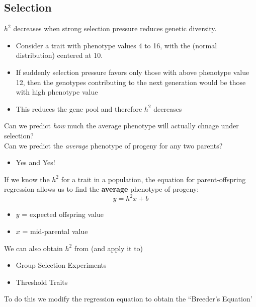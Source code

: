 \documentclass[10pt]{article}
\begin{document}
\subsection*{Selection}
$h^2$ decreases when strong selection pressure reduces genetic diversity.
\begin{itemize}
	\item Consider a trait with phenotype values 4 to 16, with the (normal distribution) centered at 10.
	\item If suddenly selection pressure favors only those with above phenotype value 12, then the genotypes contributing to the next generation would be those with high phenotype value
	\item This reduces the gene pool and therefore $h^2$ decreases
\end{itemize}
Can we predict \textit{how} much the average phenotype will actually chnage under selection? \\
Can we predict the \textit{average} phenotype of progeny for any two parents?
\begin{itemize}
	\item Yes and Yes!
\end{itemize}
If we know the $h^2$ for a trait in a population, the equation for parent-offspring regression allows us to find the \textbf{average} phenotype of progeny:
\[y = h^2 x + b\]
\begin{itemize}
	\item $y$ = expected offspring value
	\item $x$ = mid-parental value
\end{itemize}
We can also obtain $h^2$ from (and apply it to)
\begin{itemize}
	\item Group Selection Experiments
	\item Threshold Traits
\end{itemize}
To do this we modify the regression equation to obtain the ``Breeder's Equation'
\end{document}
